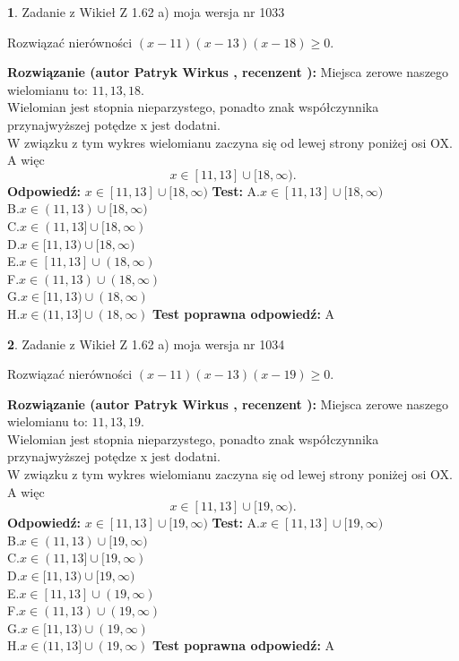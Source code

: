\documentclass[12pt, a4paper]{article}
\theoremstyle{definition} %
\newtheorem{zad}{}
\newcommand{\zadStart}[1]{\begin{zad}#1\newline}
\newcommand{\zadStop}{\end{zad}}
\newcommand{\rozwStart}[2]{\noindent \textbf{Rozwiązanie (autor #1 , recenzent #2): }\newline}
\newcommand{\rozwStop}{\newline}
\newcommand{\odpStart}{\noindent \textbf{Odpowiedź:}\newline}
\newcommand{\odpStop}{\newline}
\newcommand{\testStart}{\noindent \textbf{Test:}\newline}
\newcommand{\testStop}{\newline}
\newcommand{\kluczStart}{\noindent \textbf{Test poprawna odpowiedź:}\newline}
\newcommand{\kluczStop}{\newline}
\begin{document}
\zadStart{Zadanie z Wikieł Z 1.62 a) moja wersja nr 1033}

Rozwiązać nierówności $(x-11)(x-13)(x-18)\ge0$.
\zadStop
\rozwStart{Patryk Wirkus}{}
Miejsca zerowe naszego wielomianu to: $11, 13, 18$.\\
Wielomian jest stopnia nieparzystego, ponadto znak współczynnika przy\linebreak najwyższej potędze x jest dodatni.\\ W związku z tym wykres wielomianu zaczyna się od lewej strony poniżej osi OX. A więc $$x \in [11,13] \cup [18,\infty).$$
\rozwStop
\odpStart
$x \in [11,13] \cup [18,\infty)$
\odpStop
\testStart
A.$x \in [11,13] \cup [18,\infty)$\\
B.$x \in (11,13) \cup [18,\infty)$\\
C.$x \in (11,13] \cup [18,\infty)$\\
D.$x \in [11,13) \cup [18,\infty)$\\
E.$x \in [11,13] \cup (18,\infty)$\\
F.$x \in (11,13) \cup (18,\infty)$\\
G.$x \in [11,13) \cup (18,\infty)$\\
H.$x \in (11,13] \cup (18,\infty)$
\testStop
\kluczStart
A
\kluczStop



\zadStart{Zadanie z Wikieł Z 1.62 a) moja wersja nr 1034}

Rozwiązać nierówności $(x-11)(x-13)(x-19)\ge0$.
\zadStop
\rozwStart{Patryk Wirkus}{}
Miejsca zerowe naszego wielomianu to: $11, 13, 19$.\\
Wielomian jest stopnia nieparzystego, ponadto znak współczynnika przy\linebreak najwyższej potędze x jest dodatni.\\ W związku z tym wykres wielomianu zaczyna się od lewej strony poniżej osi OX. A więc $$x \in [11,13] \cup [19,\infty).$$
\rozwStop
\odpStart
$x \in [11,13] \cup [19,\infty)$
\odpStop
\testStart
A.$x \in [11,13] \cup [19,\infty)$\\
B.$x \in (11,13) \cup [19,\infty)$\\
C.$x \in (11,13] \cup [19,\infty)$\\
D.$x \in [11,13) \cup [19,\infty)$\\
E.$x \in [11,13] \cup (19,\infty)$\\
F.$x \in (11,13) \cup (19,\infty)$\\
G.$x \in [11,13) \cup (19,\infty)$\\
H.$x \in (11,13] \cup (19,\infty)$
\testStop
\kluczStart
A
\kluczStop
\end{document}
